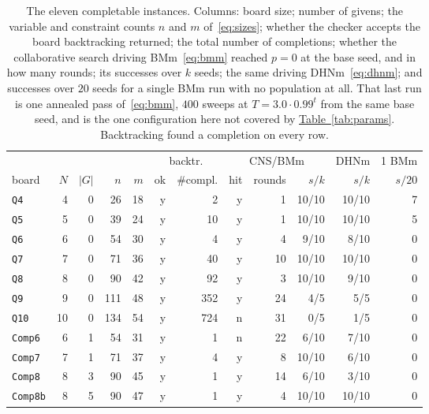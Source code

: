 \documentclass{easychair}
\newcommand{\tabref}[1]{\textcolor{academicpurple}{\hyperref[#1]{Table~\ref*{#1}}}}
\begin{document}
\begin{table}[t]
\centering\footnotesize
\setlength{\tabcolsep}{3.5pt}
\begin{tabular}{@{}lrrrr rr rrr r r@{}}
\toprule
& & & & & \multicolumn{2}{c}{backtr.}
& \multicolumn{3}{c}{CNS/BMm} & DHNm & 1 BMm\\
\cmidrule(lr){6-7}\cmidrule(lr){8-10}\cmidrule(lr){11-11}\cmidrule(lr){12-12}
board & $N$ & $|G|$ & $n$ & $m$ & ok & \#compl. & hit & rounds & $s/k$ & $s/k$ & $s/20$\\
\midrule
\texttt{Q4}     & 4  & 0 & 26  & 18 & y & 2   & y & 1  & 10/10 & 10/10 & 7\\
\texttt{Q5}     & 5  & 0 & 39  & 24 & y & 10  & y & 1  & 10/10 & 10/10 & 5\\
\texttt{Q6}     & 6  & 0 & 54  & 30 & y & 4   & y & 4  & 9/10  & 8/10  & 0\\
\texttt{Q7}     & 7  & 0 & 71  & 36 & y & 40  & y & 10 & 10/10 & 10/10 & 0\\
\texttt{Q8}     & 8  & 0 & 90  & 42 & y & 92  & y & 3  & 10/10 & 9/10  & 0\\
\texttt{Q9}     & 9  & 0 & 111 & 48 & y & 352 & y & 24 & 4/5   & 5/5   & 0\\
\texttt{Q10}    & 10 & 0 & 134 & 54 & y & 724 & n & 31 & 0/5   & 1/5   & 0\\
\midrule
\texttt{Comp6}  & 6  & 1 & 54  & 31 & y & 1   & n & 22 & 6/10  & 7/10  & 0\\
\texttt{Comp7}  & 7  & 1 & 71  & 37 & y & 4   & y & 8  & 10/10 & 6/10  & 0\\
\texttt{Comp8}  & 8  & 3 & 90  & 45 & y & 1   & y & 14 & 6/10  & 3/10  & 0\\
\texttt{Comp8b} & 8  & 5 & 90  & 47 & y & 1   & y & 4  & 10/10 & 10/10 & 0\\
\bottomrule
\end{tabular}
\caption{The eleven completable instances. Columns: board size; number of givens; the variable and
constraint counts $n$ and $m$ of~\eqref{eq:sizes}; whether the checker accepts the board backtracking
returned; the total number of completions; whether the collaborative search driving BMm~\eqref{eq:bmm}
reached $p = 0$ at the base seed, and in how many rounds; its successes over $k$ seeds; the same
driving DHNm~\eqref{eq:dhnm}; and successes over $20$ seeds for a single BMm run with no population at
all. That last run is one annealed pass of~\eqref{eq:bmm}, $400$ sweeps at $T = 3.0\cdot0.99^{t}$ from
the same base seed, and is the one configuration here not covered by \tabref{tab:params}.
Backtracking found a completion on every row.}\label{tab:results}
\end{table}
\end{document}
